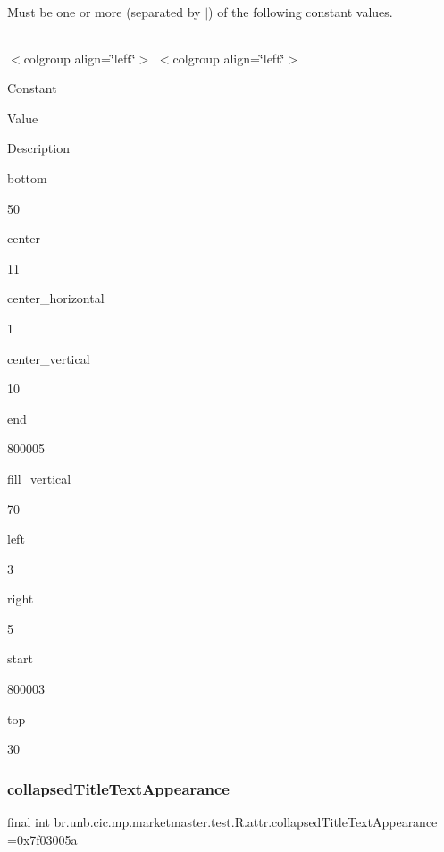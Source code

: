 Must be one or more (separated by \textquotesingle{}$\vert$\textquotesingle{}) of the following constant values.

\tabulinesep=1mm
\begin{longtabu} spread 0pt [c]{*{0}{|X[-1]}|}
\hline
\end{longtabu}
$<$colgroup align=\char`\"{}left\char`\"{}$>$ $<$colgroup align=\char`\"{}left\char`\"{}$>$ 

Constant

Value

Description 

bottom

50

center

11

center\+\_\+horizontal

1

center\+\_\+vertical

10

end

800005

fill\+\_\+vertical

70

left

3

right

5

start

800003

top

30\mbox{\label{classbr_1_1unb_1_1cic_1_1mp_1_1marketmaster_1_1test_1_1R_1_1attr_acc1ba6b1c4f491b4f4896572a5c30ce2}} 
\subsubsection{\texorpdfstring{collapsed\+Title\+Text\+Appearance}{collapsedTitleTextAppearance}}
{\footnotesize\ttfamily final int br.\+unb.\+cic.\+mp.\+marketmaster.\+test.\+R.\+attr.\+collapsed\+Title\+Text\+Appearance =0x7f03005a\hspace{0.3cm}{\ttfamily [static]}}

